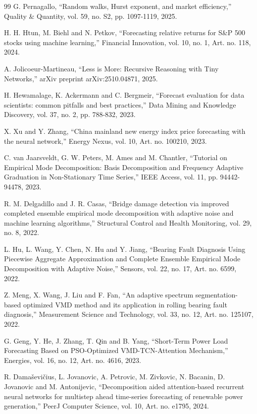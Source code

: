 \begin{thebibliography}{99}
 G. Pernagallo, ``Random walks, Hurst exponent, and market efficiency,'' Quality \&
Quantity, vol. 59, no. S2, pp. 1097-1119, 2025.

 H. H. Htun, M. Biehl and N. Petkov, ``Forecasting relative returns for S\&P 500 stocks
using machine learning,'' Financial Innovation, vol. 10, no. 1, Art. no. 118, 2024.

 A. Jolicoeur-Martineau, ``Less is More: Recursive Reasoning with Tiny Networks,''
arXiv preprint arXiv:2510.04871, 2025.

 H. Hewamalage, K. Ackermann and C. Bergmeir, ``Forecast evaluation for data
scientists: common pitfalls and best practices,'' Data Mining and Knowledge Discovery,
vol. 37, no. 2, pp. 788-832, 2023.

 X. Xu and Y. Zhang, ``China mainland new energy index price forecasting with the
neural network,'' Energy Nexus, vol. 10, Art. no. 100210, 2023.

 C. van Jaarsveldt, G. W. Peters, M. Ames and M. Chantler, ``Tutorial on Empirical Mode
Decomposition: Basis Decomposition and Frequency Adaptive Graduation in Non-Stationary
Time Series,'' IEEE Access, vol. 11, pp. 94442-94478, 2023.

 R. M. Delgadillo and J. R. Casas, ``Bridge damage detection via improved completed
ensemble empirical mode decomposition with adaptive noise and machine learning
algorithms,'' Structural Control and Health Monitoring, vol. 29, no. 8, 2022.

 L. Hu, L. Wang, Y. Chen, N. Hu and Y. Jiang, ``Bearing Fault Diagnosis Using Piecewise
Aggregate Approximation and Complete Ensemble Empirical Mode Decomposition with
Adaptive Noise,'' Sensors, vol. 22, no. 17, Art. no. 6599, 2022.

 Z. Meng, X. Wang, J. Liu and F. Fan, ``An adaptive spectrum segmentation-based
optimized VMD method and its application in rolling bearing fault diagnosis,''
Measurement Science and Technology, vol. 33, no. 12, Art. no. 125107, 2022.

 G. Geng, Y. He, J. Zhang, T. Qin and B. Yang, ``Short-Term Power Load Forecasting
Based on PSO-Optimized VMD-TCN-Attention Mechanism,'' Energies, vol. 16, no. 12, Art.
no. 4616, 2023.

 R. Dama\v{s}evi\v{c}ius, L. Jovanovic, A. Petrovic, M. Zivkovic, N. Bacanin, D.
Jovanovic and M. Antonijevic, ``Decomposition aided attention-based recurrent neural
networks for multistep ahead time-series forecasting of renewable power generation,''
PeerJ Computer Science, vol. 10, Art. no. e1795, 2024.


\end{thebibliography}
